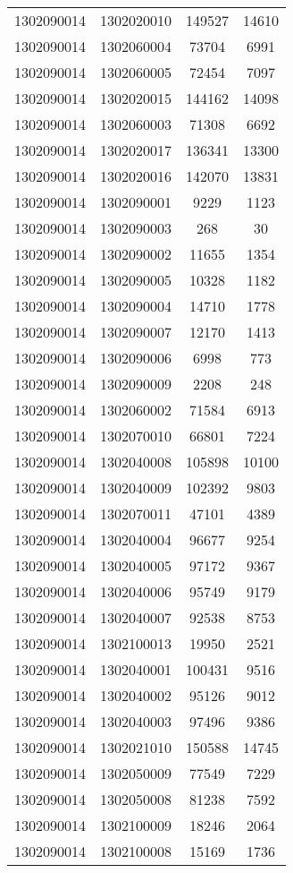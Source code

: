 \begin{longtable}{llcc}
1302090014 & 1302020010 & 149527 & 14610\\
1302090014 & 1302060004 & 73704 & 6991\\
1302090014 & 1302060005 & 72454 & 7097\\
1302090014 & 1302020015 & 144162 & 14098\\
1302090014 & 1302060003 & 71308 & 6692\\
1302090014 & 1302020017 & 136341 & 13300\\
1302090014 & 1302020016 & 142070 & 13831\\
1302090014 & 1302090001 & 9229 & 1123\\
1302090014 & 1302090003 & 268 & 30\\
1302090014 & 1302090002 & 11655 & 1354\\
1302090014 & 1302090005 & 10328 & 1182\\
1302090014 & 1302090004 & 14710 & 1778\\
1302090014 & 1302090007 & 12170 & 1413\\
1302090014 & 1302090006 & 6998 & 773\\
1302090014 & 1302090009 & 2208 & 248\\
1302090014 & 1302060002 & 71584 & 6913\\
1302090014 & 1302070010 & 66801 & 7224\\
1302090014 & 1302040008 & 105898 & 10100\\
1302090014 & 1302040009 & 102392 & 9803\\
1302090014 & 1302070011 & 47101 & 4389\\
1302090014 & 1302040004 & 96677 & 9254\\
1302090014 & 1302040005 & 97172 & 9367\\
1302090014 & 1302040006 & 95749 & 9179\\
1302090014 & 1302040007 & 92538 & 8753\\
1302090014 & 1302100013 & 19950 & 2521\\
1302090014 & 1302040001 & 100431 & 9516\\
1302090014 & 1302040002 & 95126 & 9012\\
1302090014 & 1302040003 & 97496 & 9386\\
1302090014 & 1302021010 & 150588 & 14745\\
1302090014 & 1302050009 & 77549 & 7229\\
1302090014 & 1302050008 & 81238 & 7592\\
1302090014 & 1302100009 & 18246 & 2064\\
1302090014 & 1302100008 & 15169 & 1736\\

\end{longtable}
